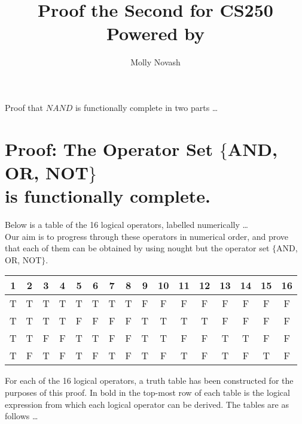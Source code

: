 \documentclass{article}
\author{Molly Novash}
\title{%
\Huge Proof the Second for CS250  \\
\normalsize Powered by \LaTeXe}
\begin{document}
\sloppy
\maketitle
\bigskip

Proof that $NAND$ is functionally complete in two parts  \ldots

\section{Proof: The Operator Set $\{$AND, OR, NOT$\}$ \\ is functionally complete.} 

Below is a table of the 16 logical operators, labelled numerically \ldots \\

Our aim is to progress through these operators in numerical order, and prove that 
each of them can be obtained by using nought but the operator set  $\{$AND, OR, NOT$\}$.

\bigskip
\begin{center}
\begin{tabular}{cccccccccccccccc}
1  & 2 & 3 & 4 & 5 & 6 & 7 & 8 & 9 & 10 & 11 & 12 & 13 & 14 & 15 & 16\\
\midrule
T & T & T & T & T & T & T & T & F & F & F & F & F & F & F & F\\
T & T & T & T & F & F & F & F & T & T & T & T & F & F & F & F\\
T & T & F & F & T & T & F & F & T & T & F & F & T & T & F & F\\
T & F & T & F & T & F & T & F & T & F & T & F & T & F & T & F\\
\end{tabular}
\end{center}

\bigskip
For each of the 16 logical operators, a truth table has been constructed for the purposes of this proof. In bold in the top-most row of each table is the logical expression from which each logical operator can be derived. The tables are as follows \ldots \\

\bigskip
\end{document}
